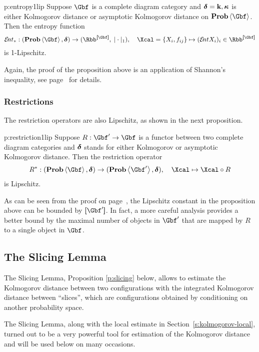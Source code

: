 \begin{proposition}{p:entropy1lip}
  Suppose $\Gbf$ is a complete diagram category and $\operatorname{{\bm\delta}}=\operatorname{\mathbf{k}},\operatorname{{\bm\kappa}}$
  is either Kolmogorov distance or asymptotic Kolmogorov distance on
  $\prob\<\Gbf>$.  Then the entropy
  function
  \[
  \ent_{*}:(\prob\<\Gbf>,\dist)\to(\Rbb^{\size{\Gbf}},\;|\cdot|_{1}),
  \quad
  \Xcal=\set{X_{i},f_{ij}}\mapsto (\ent X_{i})_{i}\in\Rbb^{\size{\Gbf}}
  \]
  is 1-Lipschitz.
\end{proposition}
  Again, the proof of the proposition above is an application of Shannon's
  inequality, see page~\pageref{p:entropy1lip.rep} for details.

\subsubsection{Restrictions}\label{s:kolmogorov-lipschitz-restrictions}
 The restriction operators are also Lipschitz, as shown in the next
 proposition.
  \begin{proposition}{p:restriction1lip}
    Suppose $R:\Gbf'\to\Gbf$ is a functor between two complete diagram
    categories and $\operatorname{{\bm\delta}}$ stands for either Kolmogorov or asymptotic
    Kolmogorov distance. Then the restriction operator
    \[
    R^{*}:(\Prob\<\Gbf>,\dist)\to(\Prob\<\Gbf'>,\dist),
    \quad 
    \Xcal\mapsto \Xcal\circ R
    \]
    is Lipschitz.
  \end{proposition}

  As can be seen from the proof on
  page~\pageref{p:restriction1lip.rep}, the Lipschitz constant in the
  proposition above can be bounded by $\size{\Gbf'}$. In fact, a more
  careful analysis provides a better bound by the maximal number of
  objects in $\Gbf'$ that are mapped by $R$ to a single object in $\Gbf$.


\subsection{The Slicing Lemma}\label{s:kolmogorov-slicing}
  The Slicing Lemma, Proposition \ref{p:slicing} below, allows to estimate the
  Kolmogorov distance between two configurations with the integrated
  Kolmogorov distance between ``slices'', which are configurations obtained by
  conditioning on another probability space.

  The Slicing Lemma, along with the local estimate in Section~\ref{s:kolmogorov-local}, turned out to be a
  very powerful tool for estimation of the Kolmogorov distance and will be
  used below on many occasions.

